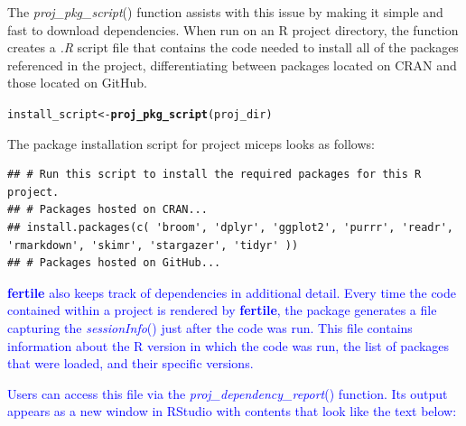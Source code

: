 \documentclass[APA,LATO1COL]{WileyNJD-v2}\usepackage[]{graphicx}\usepackage[]{color}
\makeatletter
\newcommand{\hlstd}[1]{\textcolor[rgb]{0.345,0.345,0.345}{#1}}%
\newcommand{\hlkwb}[1]{\textcolor[rgb]{0.69,0.353,0.396}{#1}}%
\newcommand{\hlkwd}[1]{\textcolor[rgb]{0.737,0.353,0.396}{\textbf{#1}}}%
\newenvironment{kframe}{%
 \def\at@end@of@kframe{}%
 \ifinner\ifhmode%
  \def\at@end@of@kframe{\end{minipage}}%
  \begin{minipage}{\columnwidth}%
 \fi\fi%
 \def\FrameCommand##1{\hskip\@totalleftmargin \hskip-\fboxsep
 \colorbox{shadecolor}{##1}\hskip-\fboxsep
     \hskip-\linewidth \hskip-\@totalleftmargin \hskip\columnwidth}%
 \MakeFramed {\advance\hsize-\width
   \@totalleftmargin\z@ \linewidth\hsize
   \@setminipage}}%
 {\par\unskip\endMakeFramed%
 \at@end@of@kframe}
\newenvironment{knitrout}{}{} %
\newcommand{\R}{\textsf{R}\xspace}
\newcommand{\cmd}[1]{\textit{#1}}
\newcommand{\pkg}[1]{\textbf{#1}}
\newcommand{\func}[1]{\textit{#1}()}
\makeatother
\begin{document}
The \func{proj\_pkg\_script} function assists with this issue by making it simple and fast to download dependencies. When run on an \R project directory, the function creates a \cmd{.R} script file that contains the code needed to install all of the packages referenced in the project, differentiating between packages located on CRAN and those located on GitHub.
\begin{knitrout}
\color{fgcolor}\begin{kframe}
\begin{alltt}
\hlstd{install_script} \hlkwb{<-} \hlkwd{proj_pkg_script}\hlstd{(proj_dir)}
\end{alltt}
\end{kframe}
\end{knitrout}

The package installation script for project miceps looks as follows:

\begin{knitrout}
\color{fgcolor}\begin{kframe}
\begin{verbatim}
## # Run this script to install the required packages for this R project.
## # Packages hosted on CRAN...
## install.packages(c( 'broom', 'dplyr', 'ggplot2', 'purrr', 'readr', 'rmarkdown', 'skimr', 'stargazer', 'tidyr' ))
## # Packages hosted on GitHub...
\end{verbatim}
\end{kframe}
\end{knitrout}

\textcolor{blue}{\pkg{fertile} also keeps track of dependencies in additional detail. Every time the code contained within a project is rendered by \pkg{fertile}, the package generates a file capturing the \func{sessionInfo} just after the code was run. This file contains information about the \R version in which the code was run, the list of packages that were loaded, and their specific versions.}

\textcolor{blue}{Users can access this file via the \func{proj\_dependency\_report} function. Its output appears as a new window in RStudio with contents that look like the text below:}
\end{document}
